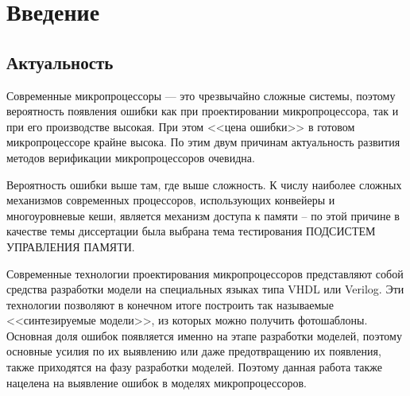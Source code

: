 \documentclass[14pt]{extreport}
\begin{document}
\pagebreak

\tableofcontents










\chapter*{Введение}

\section*{Актуальность}
Современные микропроцессоры --- это чрезвычайно сложные системы, поэтому вероятность появления ошибки как при проектировании микропроцессора, так и при его производстве высокая. При этом <<цена ошибки>> в готовом микропроцессоре крайне высока. По этим двум причинам актуальность развития методов верификации микропроцессоров очевидна. 

Вероятность ошибки выше там, где выше сложность. К числу наиболее сложных механизмов современных процессоров, использующих конвейеры и многоуровневые кеши, является механизм доступа к памяти – по этой причине в качестве темы диссертации была выбрана тема тестирования ПОДСИСТЕМ УПРАВЛЕНИЯ ПАМЯТИ.



Современные технологии проектирования микропроцессоров представляют собой средства разработки модели на специальных языках типа VHDL или Verilog. Эти технологии позволяют в конечном итоге построить так называемые <<синтезируемые модели>>, из которых можно получить фотошаблоны. Основная доля ошибок появляется именно на этапе разработки моделей, поэтому основные усилия по их выявлению или даже предотвращению их появления, также приходятся на фазу разработки моделей. Поэтому данная работа также нацелена на выявление ошибок в моделях микропроцессоров.
\end{document}
